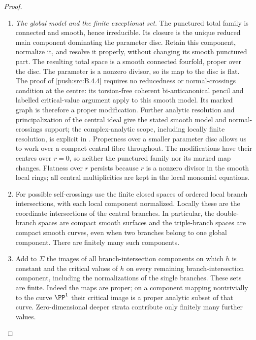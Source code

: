 \begin{proof}
\begin{enumerate}[label=\arabic*.,leftmargin=*]
\item \emph{The global model and the finite exceptional set.}
The punctured total family is connected and smooth, hence
irreducible. Its closure is the unique reduced main component
dominating the parameter disc. Retain this component, normalize
it, and resolve it properly, without changing its smooth
punctured part. The resulting total space is a smooth connected
fourfold, proper over the disc. The parameter is a nonzero
divisor, so its map to the disc is flat. The proof of \ref{push:src:B.4.4}
requires no reducedness or normal-crossings condition at the
centre: its torsion-free coherent bi-anticanonical pencil and
labelled critical-value argument apply to this smooth model.
Its marked graph is therefore a proper modification.
Further analytic resolution and principalization of the central
ideal give the stated smooth
model and normal-crossings support; the complex-analytic scope,
including locally finite resolution, is explicit in
\citet[Theorems~1.6 and 1.10, pp.~215--216, including the noncompact extension after Theorem~1.6]{BM97}. Properness over a smaller parameter disc
allows us to work over a compact central fibre throughout.
The modifications have their centres over $r=0$, so neither
the punctured family nor its marked map changes.
Flatness over $r$ persists because $r$ is a nonzero divisor in
the smooth local rings; all central multiplicities are kept in the
local monomial equations.

\item For possible self-crossings use the finite closed spaces of
ordered local branch intersections, with each local component
normalized. Locally these are the coordinate intersections of
the central branches. In particular, the double-branch spaces
are compact smooth surfaces and the triple-branch spaces are
compact smooth curves, even when two branches belong to one
global component. There are finitely many such components.

\item Add to $\Sigma$ the images of all branch-intersection components
on which $h$ is constant and the critical values of $h$ on every
remaining branch-intersection component, including the
normalizations of the single branches. These sets are finite.
Indeed the maps are proper; on a component mapping nontrivially
to the curve $\PP^1$ their critical image is a proper analytic
subset of that curve. Zero-dimensional deeper strata contribute
only finitely many further values.


\end{enumerate}
\end{proof}
